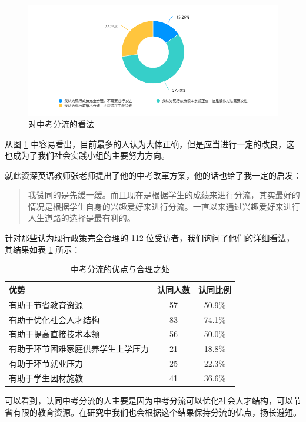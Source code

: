 \documentclass[12pt,UTF8]{ctexart}
\begin{document}
\begin{figure}[!h]
	\centering
	\includegraphics[width=4.6in]{chart/1.png}
	\caption{对中考分流的看法}
	\label{fig:1}
\end{figure}

\par {
	从图 \ref{fig:1} 中容易看出，目前最多的人认为大体正确，但是应当进行一定的改良，这也成为了我们社会实践小组的主要努力方向。
}
\par {
	就此资深英语教师张老师提出了他的中考改革方案，他的话也给了我一定的启发：
	\begin{quote}
		\kaishu
		我赞同的是先缓一缓。而且现在是根据学生的成绩来进行分流，其实最好的情况是根据学生自身的兴趣爱好来进行分流。一直以来通过兴趣爱好来进行人生道路的选择是最有利的。
	\end{quote}
}
\par {
	针对那些认为现行政策完全合理的 112 位受访者，我们询问了他们的详细看法，其结果如表 \ref{fig:2} 所示：
}
\begin{table}[htbp]
	\centering
	\caption{中考分流的优点与合理之处}
	\label{fig:2}
	\begin{tabular}{lcc}
		\hline
		\hline
		{\bf 优势} & {\bf 认同人数} & {\bf 认同比例}\\ \hline
		有助于节省教育资源 & 57 & 50.9\% \\
		有助于优化社会人才结构 & 83 & 74.1\% \\
		有助于提高直接技术本领 & 56 & 50.0\% \\
		有助于环节困难家庭供养学生上学压力 & 21 & 18.8\% \\
		有助于环节就业压力 & 25 & 22.3\% \\
		有助于学生因材施教 & 41 & 36.6\% \\
		\hline
		\hline
	\end{tabular}
\end{table}
\par {
	可以看到，认同中考分流的人主要是因为中考分流可以优化社会人才结构，可以节省有限的教育资源。在研究中我们也会根据这个结果保持分流的优点，扬长避短。
}
\end{document}
